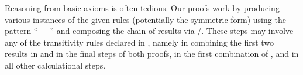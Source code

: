 \begin{isabellebody}
\isanewline
{}\isamarkupfalse%
%
\endisatagproof
{\isafoldproof}%
%
\isadelimproof
%
\endisadelimproof
%
\begin{isamarkuptext}%
\noindent Reasoning from basic axioms is often tedious.  Our proofs
  work by producing various instances of the given rules (potentially
  the symmetric form) using the pattern ``\hyperlink{command.have}{\mbox{}}~~\hyperlink{command.by}{\mbox{}}~'' and composing the chain of
  results via \hyperlink{command.also}{\mbox{}}/\hyperlink{command.finally}{\mbox{}}.  These steps may
  involve any of the transitivity rules declared in
  , namely  in combining
  the first two results in  and in the final steps of
  both proofs,  in the first combination of , and  in all other calculational steps.


\end{isamarkuptext}
\end{isabellebody}

